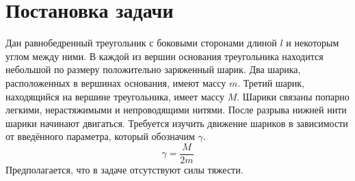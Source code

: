 \documentclass[landscape]{article}
\begin{document}
\section{Постановка задачи}
Дан равнобедренный треугольник с боковыми сторонами длиной $l$ и некоторым углом между ними. 
В каждой из вершин основания треугольника находится небольшой по размеру положительно заряженный шарик. 
Два шарика, расположенных в вершинах основания, имеют массу $m$. 
Третий шарик, находящийся на вершине треугольника, имеет массу 
$M$. Шарики связаны попарно легкими, нерастяжимыми и непроводящими нитями.
После разрыва нижней нити шарики начинают двигаться. Требуется изучить движение шариков в зависимости от введённого параметра, который обозначим $\gamma$. 
\begin{equation}
    \gamma = \frac{M}{2m}
\end{equation}
Предполагается, что в задаче отсутствуют силы тяжести.
\end{document}
